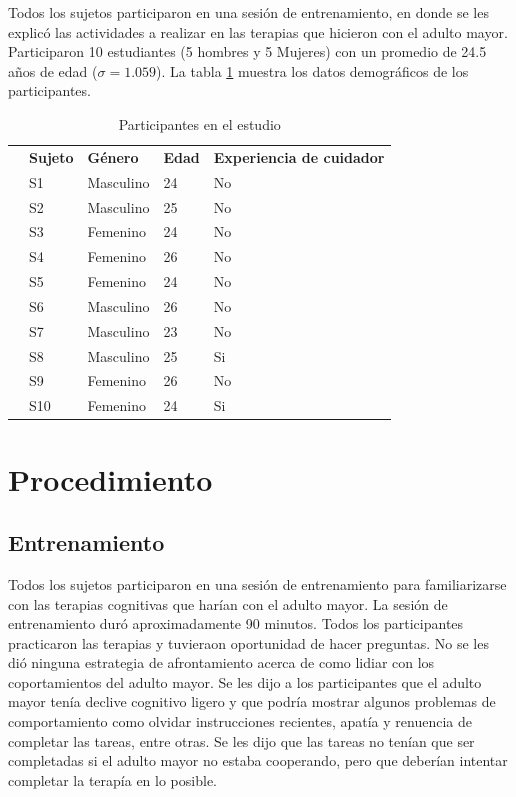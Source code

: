 Todos los sujetos participaron en una sesi\'on de entrenamiento, en donde se les explic\'o las actividades a realizar en las terapias que hicieron con el adulto mayor.
Participaron 10 estudiantes (5 hombres y 5 Mujeres) con un promedio de 24.5 a\~nos de edad ($\sigma=1.059$). La tabla \ref{table:kysymys} muestra los datos demogr\'aficos de los participantes.
\begin{table}
	\footnotesize
	\centering
	\caption{Participantes en el estudio}
	\label{table:kysymys}
	\begin{tabular}{m{0.2cm}m{2.5cm}m{2.5cm}m{2.5cm}m{2.5cm}}
		\hline\noalign{\smallskip}
		 & \textbf{Sujeto} & \textbf{G\'enero} & \textbf{Edad} & \textbf{Experiencia de cuidador}
		\\ \noalign{\smallskip}
		\hline
		\noalign{\smallskip}
		&S1& Masculino & 24 & No   \\ 
		&S2& Masculino &  25&  No  \\ 
		&S3& Femenino & 24 & No   \\ 
		&S4& Femenino & 26 & No  \\ 
		&S5& Femenino & 24 & No   \\ 
		&S6& Masculino & 26 &  No  \\ 
		&S7& Masculino & 23 &  No \\ 
		&S8& Masculino & 25 &  Si  \\ 
		&S9& Femenino & 26 & No   \\ 
	  	&S10& Femenino & 24 & Si  \\ 
		\hline
	\end{tabular}
\end{table}
\section{Procedimiento}\label{secc:methods}
\subsection{Entrenamiento}\label{secc:training}
Todos los sujetos participaron en una sesi\'on de entrenamiento para familiarizarse con las terapias cognitivas que har\'ian con el adulto mayor. La sesi\'on de entrenamiento dur\'o aproximadamente 90 minutos. Todos los participantes practicaron las terapias y tuvieraon oportunidad de hacer preguntas. No se les di\'o ninguna estrategia de afrontamiento acerca de como lidiar con los coportamientos del adulto mayor. Se les dijo a los participantes que el adulto mayor ten\'ia declive cognitivo ligero y que podr\'ia mostrar algunos problemas de comportamiento como olvidar instrucciones recientes, apat\'ia y renuencia de completar las tareas, entre otras. Se les dijo que las tareas no ten\'ian que ser completadas si el adulto mayor no estaba cooperando, pero que deber\'ian intentar completar la terap\'ia en lo posible.

